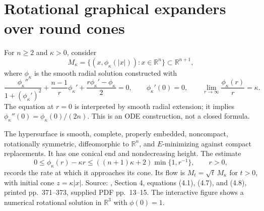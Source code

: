 \chapter{Rotational graphical expanders over round cones}\label{sec:catalogue-rotational-expanders}
\begin{example}\label{ex:catalogue-rotational-expanders}
For $n\geq2$ and $\kappa>0$, consider
\[
 M_\kappa=\{(x,\phi_\kappa(|x|)):x\in\mathbb R^n\}\subset\mathbb R^{n+1},
\]
where $\phi_\kappa$ is the smooth radial solution constructed with
\[
 \frac{\phi_\kappa''}{1+(\phi_\kappa')^2}
 +\frac{n-1}{r}\phi_\kappa'
 +\frac{r\phi_\kappa'-\phi_\kappa}{2}=0,
 \qquad \phi_\kappa'(0)=0,
 \qquad \lim_{r\to\infty}\frac{\phi_\kappa(r)}r=\kappa.
\]
The equation at $r=0$ is interpreted by smooth radial extension; it implies $\phi_\kappa''(0)=\phi_\kappa(0)/(2n)$. This is an ODE construction, not a closed formula.

The hypersurface is smooth, complete, properly embedded, noncompact, rotationally symmetric, diffeomorphic to $\mathbb R^n$, and $E$-minimizing against compact replacements. It has one conical end and nondecreasing height. The estimate
\[
 0\leq\phi_\kappa(r)-\kappa r
 \leq((n+1)\kappa+2)\min\{1,r^{-1}\},\qquad r>0,
\]
records the rate at which it approaches its cone. Its flow is $M_t=\sqrt t\,M_\kappa$ for $t>0$, with initial cone $z=\kappa|x|$. Source: \cite{CatDing20}, Section 4, equations (4.1), (4.7), and (4.8), printed pp.~371--373, supplied PDF pp.~13--15. The interactive figure shows a numerical rotational solution in $\mathbb R^3$ with $\phi(0)=1$.
\end{example}

